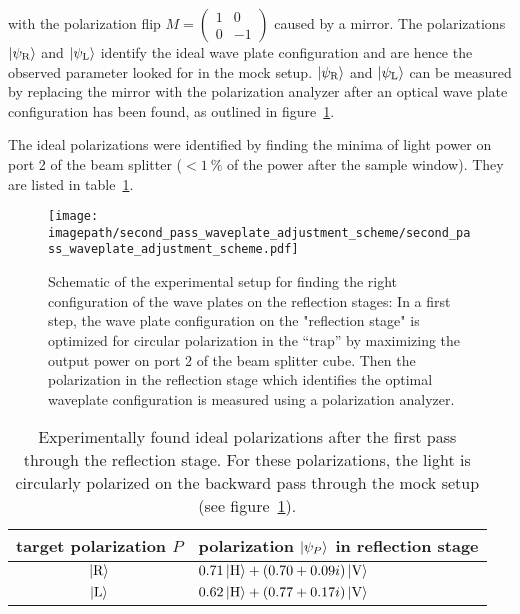 with the polarization flip $M = \left(\begin{smallmatrix}1&0\\0&-1\end{smallmatrix}\right)$ caused by a mirror. The polarizations $\Ket{\psi_\text{R}}$ and $\Ket{\psi_\text{L}}$ identify the ideal wave plate configuration and are hence the observed parameter looked for in the mock setup. $\Ket{\psi_\text{R}}$ and $\Ket{\psi_\text{L}}$ can be measured by replacing the mirror with the polarization analyzer after an optical wave plate configuration has been found, as outlined in figure~\ref{fig:second_pass_waveplate_adjustment_scheme}.

The ideal polarizations were identified by finding the minima of light power on port 2 of the beam splitter ($< \SI{1}{\percent}$ of the power after the sample window). They are listed in table~\ref{tab:polarization_second_pass}.

\begin{figure}
    \centering
    \texttt{[image: \\imagepath/second\_pass\_waveplate\_adjustment\_scheme/second\_pass\_waveplate\_adjustment\_scheme.pdf]}
    \caption{Schematic of the experimental setup for finding the right configuration of the wave plates on the reflection stages: In a first step, the wave plate configuration on the "reflection stage" is optimized for circular polarization in the ``trap'' by maximizing the output power on port 2 of the beam splitter cube. Then the polarization in the reflection stage which identifies the optimal waveplate configuration is measured using a polarization analyzer.}\label{fig:second_pass_waveplate_adjustment_scheme}
\end{figure}

\begin{table}
    \centering
    \begin{tabular}{cl}
        \toprule
        target polarization $P$ & polarization $\Ket{\psi_P}$ in reflection stage \\
        \midrule
        $\Ket{\text{R}}$ & $0.71 \Ket{\text{H}} + (0.70+0.09i) \Ket{\text{V}}$ \\
        $\Ket{\text{L}}$ & $0.62\Ket{\text{H}} + (0.77+0.17i)\Ket{\text{V}}$ \\
        \bottomrule
    \end{tabular}
    \caption{Experimentally found ideal polarizations after the first pass through the reflection stage. For these polarizations, the light is circularly polarized on the backward pass through the mock setup (see figure~\ref{fig:second_pass_waveplate_adjustment_scheme}).}
        \label{tab:polarization_second_pass}
\end{table}

